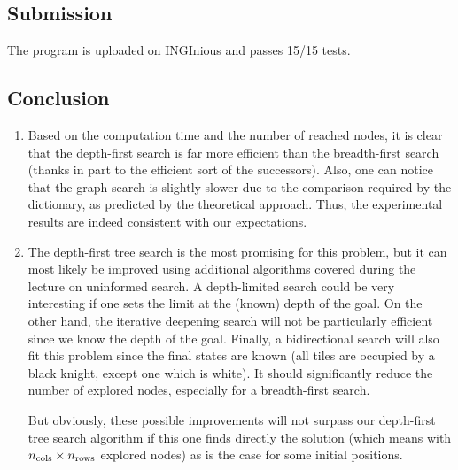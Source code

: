\documentclass[journal]{IEEEtran}
\begin{document}
 \subsection{Submission}
 The program is uploaded on INGInious and passes 15/15 tests.
 \subsection{Conclusion}
 \begin{enumerate}
  \item Based on the computation time and the number of reached nodes, it is clear that the depth-first search is far more efficient than the breadth-first search (thanks in part to the efficient sort of the successors). Also, one can notice that the graph search is slightly slower due to the comparison required by the dictionary, as predicted by the theoretical approach.
  Thus, the experimental results are indeed consistent with our expectations.
  \item The depth-first tree search is the most promising for this problem, but it can most likely be improved using additional algorithms covered during the lecture on uninformed search.
  A depth-limited search could be very interesting if one sets the limit at the (known) depth of the goal.
  On the other hand, the iterative deepening search will not be particularly efficient since we know the depth of the goal.
  Finally, a bidirectional search will also fit this problem since the final states are known (all tiles are occupied by a black knight, except one which is white).
  It should significantly reduce the number of explored nodes, especially for a breadth-first search.
  
  But obviously, these possible improvements will not surpass our depth-first tree search algorithm if this one finds directly the solution (which means with \(n_{\textnormal{cols}} \times n_{\textnormal{\vphantom{l}rows}}\) explored nodes) as is the case for some initial positions.
 \end{enumerate}
\end{document}
